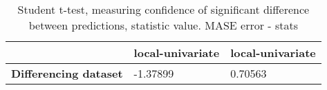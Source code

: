 \begin{table}[h]
\centering
\caption{Student t-test, measuring confidence of significant difference between predictions, statistic value. MASE error - stats}
\label{table:ttest-stats-differencing-experiments-MASE}
\begin{tabular}{lll}
\toprule
{} & local-univariate & local-univariate \\
\midrule
\textbf{Differencing dataset} &         -1.37899 &          0.70563 \\
\bottomrule
\end{tabular}
\end{table}
